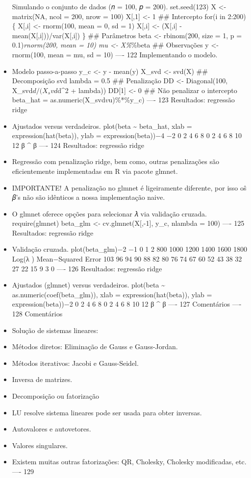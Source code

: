 \documentclass[
]{article}
\begin{document}
\begin{itemize}
  Simulando o conjunto de dados (𝑛 = 100, 𝑝 = 200). set.seed(123) X
  \textless- matrix(NA, ncol = 200, nrow = 100) X{[},1{]} \textless- 1
  \#\# Intercepto for(i in 2:200) \{ X{[},i{]} \textless- rnorm(100,
  mean = 0, sd = 1) X{[},i{]} \textless- (X{[},i{]} -
  mean(X{[},i{]}))/var(X{[},i{]}) \} \#\# Parâmetros beta \textless-
  rbinom(200, size = 1, p = 0.1)\emph{rnorm(200, mean = 10) mu
  \textless- X\%}\%beta \#\# Observações y \textless- rnorm(100, mean =
  mu, sd = 10) ---- 122 Implementando o modelo.
\item
  Modelo passo-a-passo y\_c \textless- y - mean(y) X\_svd \textless-
  svd(X) \#\# Decomposição svd lambda = 0.5 \#\# Penalização DD
  \textless- Diagonal(100, X\_svd\(d/(X_svd\)d\^{}2 + lambda)) DD{[}1{]}
  \textless- 0 \#\# Não penalizar o intercepto beta\_hat =
  as.numeric(X\_svd\(v%
  \)u)\%*\%y\_c) ---- 123 Resultados: regressão ridge
\item
  Ajustados versus verdadeiros. plot(beta \textasciitilde{} beta\_hat,
  xlab = expression(hat(beta)), ylab = expression(beta))−4 −2 0 2 4 6 8
  0 2 4 6 8 10 12 β \^{} β ---- 124 Resultados: regressão ridge
\item
  Regressão com penalização ridge, bem como, outras penalizações são
  eficientemente implementadas em R via pacote glmnet.
\item
  IMPORTANTE! A penalização no glmnet é ligeiramente diferente, por isso
  oŝ 𝛽's não são idênticos a nossa implementação naive.
\item
  O glmnet oferece opções para selecionar 𝜆 via validação cruzada.
  require(glmnet) beta\_glm \textless- cv.glmnet(X{[},-1{]}, y\_c,
  nlambda = 100) ---- 125 Resultados: regressão ridge
\item
  Validação cruzada. plot(beta\_glm)−2 −1 0 1 2 800 1000 1200 1400 1600
  1800 Log(λ ) Mean−Squared Error 103 96 94 90 88 82 80 76 74 67 60 52
  43 38 32 27 22 15 9 3 0 ---- 126 Resultados: regressão ridge
\item
  Ajustados (glmnet) versus verdadeiros. plot(beta \textasciitilde{}
  as.numeric(coef(beta\_glm)), xlab = expression(hat(beta)), ylab =
  expression(beta))−2 0 2 4 6 8 0 2 4 6 8 10 12 β \^{} β ---- 127
  Comentários ---- 128 Comentários
\item
  Solução de sistemas lineares:
\item
  Métodos diretos: Eliminação de Gauss e Gauss-Jordan.
\item
  Métodos iterativos: Jacobi e Gauss-Seidel.
\item
  Inversa de matrizes.
\item
  Decomposição ou fatorização
\item
  LU resolve sistema lineares pode ser usada para obter inversas.
\item
  Autovalores e autovetores.
\item
  Valores singulares.
\item
  Existem muitas outras fatorizações: QR, Cholesky, Cholesky
  modificadas, etc. ---- 129
\end{itemize}
\end{document}
